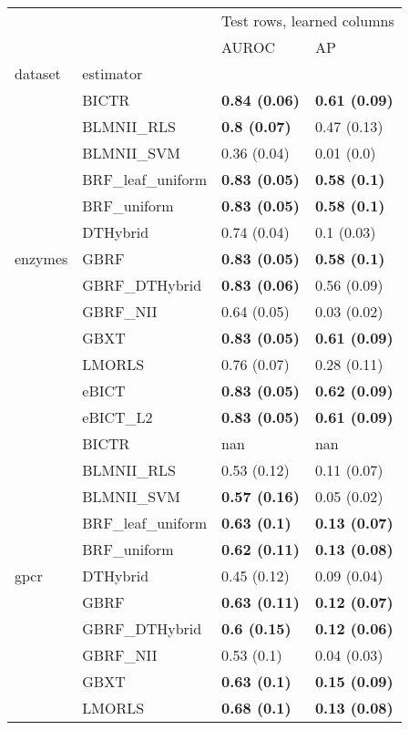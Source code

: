 \begin{tabular}{llll}
\toprule
 &  & \multicolumn{2}{r}{Test rows, learned columns} \\
 &  & AUROC & AP \\
dataset & estimator &  &  \\
\midrule
\multirow[c]{13}{*}{enzymes} & BICTR & \textbf{0.84 (0.06)} & \textbf{0.61 (0.09)} \\
 & BLMNII\_RLS & \textbf{0.8 (0.07)} & 0.47 (0.13) \\
 & BLMNII\_SVM & 0.36 (0.04) & 0.01 (0.0) \\
 & BRF\_leaf\_uniform & \textbf{0.83 (0.05)} & \textbf{0.58 (0.1)} \\
 & BRF\_uniform & \textbf{0.83 (0.05)} & \textbf{0.58 (0.1)} \\
 & DTHybrid & 0.74 (0.04) & 0.1 (0.03) \\
 & GBRF & \textbf{0.83 (0.05)} & \textbf{0.58 (0.1)} \\
 & GBRF\_DTHybrid & \textbf{0.83 (0.06)} & 0.56 (0.09) \\
 & GBRF\_NII & 0.64 (0.05) & 0.03 (0.02) \\
 & GBXT & \textbf{0.83 (0.05)} & \textbf{0.61 (0.09)} \\
 & LMORLS & 0.76 (0.07) & 0.28 (0.11) \\
 & eBICT & \textbf{0.83 (0.05)} & \textbf{0.62 (0.09)} \\
 & eBICT\_L2 & \textbf{0.83 (0.05)} & \textbf{0.61 (0.09)} \\
\cline{1-2}
\multirow[c]{13}{*}{gpcr} & BICTR & nan & nan \\
 & BLMNII\_RLS & 0.53 (0.12) & 0.11 (0.07) \\
 & BLMNII\_SVM & \textbf{0.57 (0.16)} & 0.05 (0.02) \\
 & BRF\_leaf\_uniform & \textbf{0.63 (0.1)} & \textbf{0.13 (0.07)} \\
 & BRF\_uniform & \textbf{0.62 (0.11)} & \textbf{0.13 (0.08)} \\
 & DTHybrid & 0.45 (0.12) & 0.09 (0.04) \\
 & GBRF & \textbf{0.63 (0.11)} & \textbf{0.12 (0.07)} \\
 & GBRF\_DTHybrid & \textbf{0.6 (0.15)} & \textbf{0.12 (0.06)} \\
 & GBRF\_NII & 0.53 (0.1) & 0.04 (0.03) \\
 & GBXT & \textbf{0.63 (0.1)} & \textbf{0.15 (0.09)} \\
 & LMORLS & \textbf{0.68 (0.1)} & \textbf{0.13 (0.08)} \\

\end{tabular}
